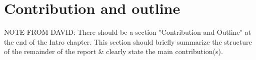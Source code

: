 \section{Contribution and outline}

NOTE FROM DAVID: There should be a section "Contribution and Outline" at the end
of the Intro chapter. This section should briefly summarize the structure of the
remainder of the report \& clearly state the main contribution(s).
